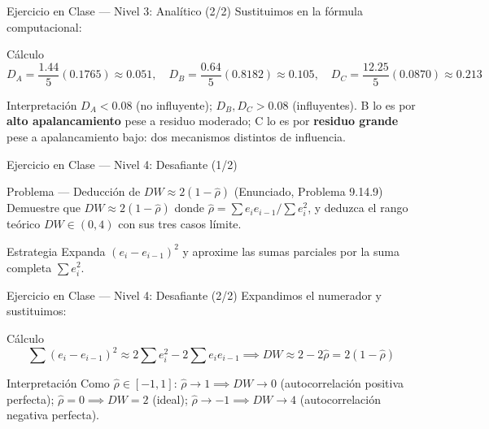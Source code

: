 \documentclass[10pt, aspectratio=169]{beamer}
\begin{document}
\begin{frame}{Ejercicio en Clase --- Nivel 3: Analítico (2/2)}
  \scriptsize
  Sustituimos en la fórmula computacional: \pause

  \vspace{0.05cm}
  \begin{block}{Cálculo}
    \scriptsize
    $$D_A=\frac{1.44}{5}(0.1765)\approx0.051, \quad D_B=\frac{0.64}{5}(0.8182)\approx0.105, \quad D_C=\frac{12.25}{5}(0.0870)\approx0.213$$
  \end{block}

  \vspace{0.05cm}
  \pause
  \begin{alertblock}{Interpretación}
    \scriptsize
    $D_A<0.08$ (no influyente); $D_B,D_C>0.08$ (influyentes). B lo es por \textbf{alto apalancamiento} pese a residuo moderado; C lo es por \textbf{residuo grande} pese a apalancamiento bajo: dos mecanismos distintos de influencia.
  \end{alertblock}
\end{frame}

\begin{frame}{Ejercicio en Clase --- Nivel 4: Desafiante (1/2)}
  \footnotesize
  \begin{block}{Problema --- Deducción de $DW\approx2(1-\hat\rho)$ (Enunciado, Problema 9.14.9)}
    Demuestre que $DW\approx2(1-\hat\rho)$ donde $\hat\rho=\sum e_ie_{i-1}/\sum e_i^2$, y deduzca el rango teórico $DW\in(0,4)$ con sus tres casos límite.
  \end{block}

  \vspace{0.1cm}
  \pause
  \begin{alertblock}{Estrategia}
    \scriptsize
    Expanda $(e_i-e_{i-1})^2$ y aproxime las sumas parciales por la suma completa $\sum e_i^2$.
  \end{alertblock}
\end{frame}

\begin{frame}{Ejercicio en Clase --- Nivel 4: Desafiante (2/2)}
  \scriptsize
  Expandimos el numerador y sustituimos: \pause

  \vspace{0.05cm}
  \begin{block}{Cálculo}
    \scriptsize
    $$\sum(e_i-e_{i-1})^2\approx2\sum e_i^2-2\sum e_ie_{i-1} \implies DW\approx2-2\hat\rho=2(1-\hat\rho)$$
  \end{block}

  \vspace{0.05cm}
  \pause
  \begin{alertblock}{Interpretación}
    \scriptsize
    Como $\hat\rho\in[-1,1]$: $\hat\rho\to1\implies DW\to0$ (autocorrelación positiva perfecta); $\hat\rho=0\implies DW=2$ (ideal); $\hat\rho\to-1\implies DW\to4$ (autocorrelación negativa perfecta).
  \end{alertblock}
\end{frame}
\end{document}
